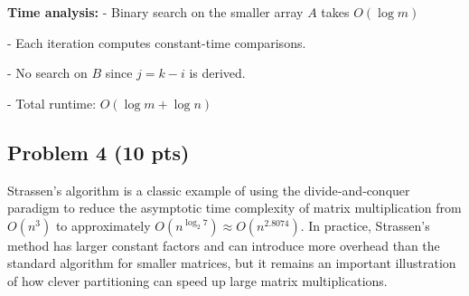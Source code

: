 \documentclass[12pt]{article}
\begin{document}
\textbf{Time analysis:}
- Binary search on the smaller array \(A\) takes \(O(\log m)\)

- Each iteration computes constant-time comparisons.

- No search on \(B\) since \(j = k - i\) is derived.

- Total runtime: \(\boxed{O(\log m + \log n)}\)

\subsection*{Problem 4 (10 pts)}
Strassen’s algorithm is a classic example of using the divide‐and‐conquer paradigm to reduce the asymptotic time complexity of matrix multiplication from $O(n^3)$ to approximately $O(n^{\log_2 7}) \approx O(n^{2.8074})$. In practice, Strassen’s method has larger constant factors and can introduce more overhead than the standard algorithm for smaller matrices, but it remains an important illustration of how clever partitioning can speed up large matrix multiplications.\\
\end{document}
